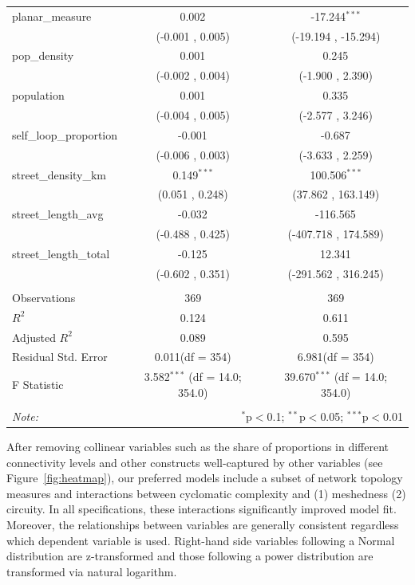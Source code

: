 \documentclass[
  10pt,
]{article}
\begin{document}
\begin{table}[!htbp]
\begin{tabular}{@{\extracolsep{5pt}}lcc}
 planar\_measure & 0.002$^{}$ & -17.244$^{***}$ \\
  & (-0.001 , 0.005) & (-19.194 , -15.294) \\
 pop\_density & 0.001$^{}$ & 0.245$^{}$ \\
  & (-0.002 , 0.004) & (-1.900 , 2.390) \\
 population & 0.001$^{}$ & 0.335$^{}$ \\
  & (-0.004 , 0.005) & (-2.577 , 3.246) \\
 self\_loop\_proportion & -0.001$^{}$ & -0.687$^{}$ \\
  & (-0.006 , 0.003) & (-3.633 , 2.259) \\
 street\_density\_km & 0.149$^{***}$ & 100.506$^{***}$ \\
  & (0.051 , 0.248) & (37.862 , 163.149) \\
 street\_length\_avg & -0.032$^{}$ & -116.565$^{}$ \\
  & (-0.488 , 0.425) & (-407.718 , 174.589) \\
 street\_length\_total & -0.125$^{}$ & 12.341$^{}$ \\
  & (-0.602 , 0.351) & (-291.562 , 316.245) \\
\hline \\[-1.8ex]
 Observations & 369 & 369 \\
 $R^2$ & 0.124 & 0.611 \\
 Adjusted $R^2$ & 0.089 & 0.595 \\
 Residual Std. Error & 0.011(df = 354) & 6.981(df = 354)  \\
 F Statistic & 3.582$^{***}$ (df = 14.0; 354.0) & 39.670$^{***}$ (df = 14.0; 354.0) \\
\hline
\hline \\[-1.8ex]
\textit{Note:} & \multicolumn{2}{r}{$^{*}$p$<$0.1; $^{**}$p$<$0.05; $^{***}$p$<$0.01} \\
\end{tabular}
\end{table}

After removing collinear variables such as the share of proportions in
different connectivity levels and other constructs well-captured by
other variables (see Figure~\ref{fig:heatmap}), our preferred models
include a subset of network topology measures and interactions between
cyclomatic complexity and (1) meshedness (2) circuity. In all
specifications, these interactions significantly improved model fit.
Moreover, the relationships between variables are generally consistent
regardless which dependent variable is used. Right-hand side variables
following a Normal distribution are z-transformed and those following a
power distribution are transformed via natural logarithm.
\end{document}
